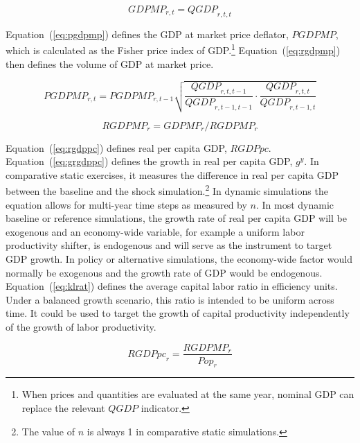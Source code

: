 \documentclass[11pt,letterpaper]{report}
\begin{document}
\begin{equation}
\label{eq:gdpmp}
\mathit{GDPMP}_{r,t} = \mathit{QGDP}_{r,\mathit{t},\mathit{t}}
\end{equation}

Equation~(\ref{eq:pgdpmp}) defines the GDP at market price deflator,
$\mathit{PGDPMP}$, which is calculated as the Fisher price index of
GDP.\footnote{When prices and quantities are evaluated at the same year,
nominal GDP can replace the relevant $\mathit{QGDP}$ indicator.}
Equation~(\ref{eq:rgdpmp}) then defines the volume of GDP at market price.

\begin{equation}
\label{eq:pgdpmp}
\mathit{PGDPMP}_{r,t} =
   \mathit{PGDPMP}_{r,t-1} \sqrt{
      \frac{\mathit{QGDP}_{r,t,t-1}}{\mathit{QGDP}_{r,t-1,t-1}} \cdot
      \frac{\mathit{QGDP}_{r,t,t}} {\mathit{QGDP}_{r,t-1,t}}
   }
\end{equation}

\begin{equation}
\label{eq:rgdpmp}
\mathit{RGDPMP}_{r} = \mathit{GDPMP}_{r} / \mathit{RGDPMP}_{r}
\end{equation}

Equation~(\ref{eq:rgdppc}) defines real per capita GDP, $\mathit{RGDPpc}$.
Equation~(\ref{eq:grgdppc}) defines the growth in real per capita GDP,
$\mathit{g^y}$. In comparative static exercises, it measures the difference in
real per capita GDP between the baseline and the shock
simulation.\footnote{The value of $n$ is always 1 in comparative static
simulations.} In dynamic simulations the equation allows for multi-year time
steps as measured by $n$. In most dynamic baseline or reference simulations, the
growth rate of real per capita GDP will be exogenous and an economy-wide
variable, for example a uniform labor productivity shifter, is endogenous and
will serve as the instrument to target GDP growth. In policy or alternative
simulations, the economy-wide factor would normally be exogenous and the growth
rate of GDP would be endogenous. Equation~(\ref{eq:klrat}) defines the average
capital labor ratio in efficiency units. Under a balanced growth scenario, this
ratio is intended to be uniform across time. It could be used to target the
growth of capital productivity independently of the growth of labor
productivity.

\begin{equation}
\label{eq:rgdppc}
\mathit{RGDPpc}_{r} = \frac{\mathit{RGDPMP}_{r}} {\mathit{Pop}_{r}}
\end{equation}
\end{document}
